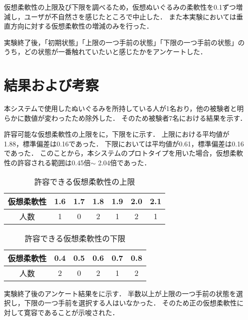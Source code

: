\documentclass[uplatex]{jsarticle}   %
\begin{document}
仮想柔軟性の上限及び下限を調べるため，仮想ぬいぐるみの柔軟性を0.1ずつ増減し，ユーザが不自然さを感じたところで中止した．
また本実験においては垂直方向に対する仮想柔軟性の増減のみを行った．

実験終了後，「初期状態」「上限の一つ手前の状態」「下限の一つ手前の状態」のうち，どの状態が一番触れていたいと感じたかをアンケートした．


\section{結果および考察}
本システムで使用したぬいぐるみを所持している人が1名おり，他の被験者と明らかに数値が変わったため除外した．
そのため被験者7名における結果を示す．

    許容可能な仮想柔軟性の上限をに，下限をに示す．
    上限における平均値が1.88，標準偏差は0.16であった．
    下限においては平均値が0.61，標準偏差は0.16であった．
    このことから，本システムのプロトタイプを用いた場合，仮想柔軟性の許容される範囲は0.45倍$\sim$ 2.04倍であった．
    

    \begin{table}[t]
        \caption{\label{tab:result1}許容できる仮想柔軟性の上限}
        \centering
        \begin{tabular}{c|c|c|c|c|c|c}
            \hline
            \hline
            仮想柔軟性 &1.6 &1.7 &1.8 &1.9 &2.0 &2.1 \\
            \hline
            人数 &1 &0 &2 &1 &2 &1 \\
            \hline
        \end{tabular}
    \end{table}
    
    \begin{table}[t]
        \caption{\label{tab:result2}許容できる仮想柔軟性の下限}
        \centering
        \begin{tabular}{c|c|c|c|c|c}
            \hline
            \hline
            仮想柔軟性 &0.4 &0.5 &0.6 &0.7 &0.8 \\
            \hline
            人数 &2 &0 &2 &1 &2\\
            \hline
        \end{tabular}
    \end{table}


    実験終了後のアンケート結果をに示す．
    半数以上が上限の一つ手前の状態を選択し，下限の一つ手前を選択する人はいなかった．
    そのため正の仮想柔軟性に対して寛容であることが示唆された．
    
\end{document}
